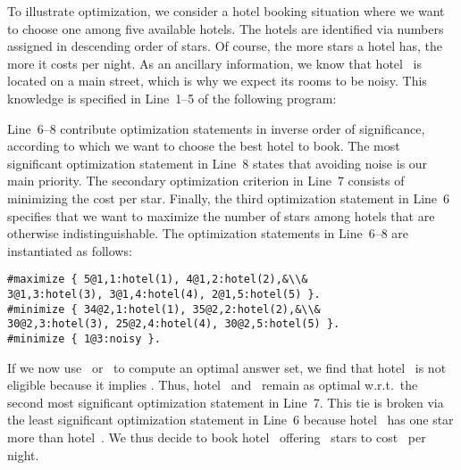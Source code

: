 \begin{example}\label{ex:opt}
To illustrate optimization, we consider a hotel booking situation
where we want to choose one among five available hotels.
The hotels are identified via numbers assigned in descending order of stars.
Of course, the more stars a hotel has, the more it costs per night.
As an ancillary information, we know that hotel~ is located
on a main street, which is why we expect its rooms to be noisy.
This knowledge is specified in Line~1--5 of the following program:
%

%
Line~6--8 contribute optimization statements in inverse order of significance,
according to which we want to choose the best hotel to book.
The most significant optimization statement in Line~8 states that
avoiding noise is our main priority.
The secondary optimization criterion in Line~7 consists of
minimizing the cost per star.
Finally, the third optimization statement in Line~6 specifies that we want
to maximize the number of stars among hotels that are otherwise indistinguishable.
The optimization statements in Line~6--8 are instantiated as follows:%
%
\begin{lstlisting}[firstnumber=6,breakindent=0pt,escapechar=&]
#maximize { 5@1,1:hotel(1), 4@1,2:hotel(2),&\\&            3@1,3:hotel(3), 3@1,4:hotel(4), 2@1,5:hotel(5) }.
#minimize { 34@2,1:hotel(1), 35@2,2:hotel(2),&\\&            30@2,3:hotel(3), 25@2,4:hotel(4), 30@2,5:hotel(5) }.
#minimize { 1@3:noisy }.
\end{lstlisting}
If we now use \clasp\ or \clingo\ to compute an optimal answer set,%
we find that hotel~ is not eligible because it implies .
Thus, hotel~ and~ remain as optimal w.r.t.\ the second most
significant optimization statement in Line~7.
This tie is broken via the least significant optimization statement in Line~6
because hotel~ has one star more than hotel~.
We thus decide to book hotel~ offering~ stars
to cost~ per night.
\eexample
\end{example}


